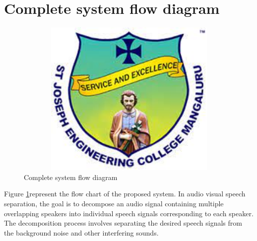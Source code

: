 \documentclass[12pt,a4paper]{report}
\begin{document}
\section{Complete system flow diagram}
\begin{figure}[hbtp]
\centering
\includegraphics[width=5in,height=3in]{./pic/sjeclogo.png}
\caption{Complete system flow diagram}
\label{fig:2}
\end{figure}
\newpage
Figure \ref{fig:2}represent the flow chart of the proposed system. In audio visual speech separation, the goal is to decompose an audio signal containing multiple overlapping speakers into individual speech signals corresponding to each speaker. The decomposition process involves separating the desired speech signals from the background noise and other interfering sounds.
\end{document}
